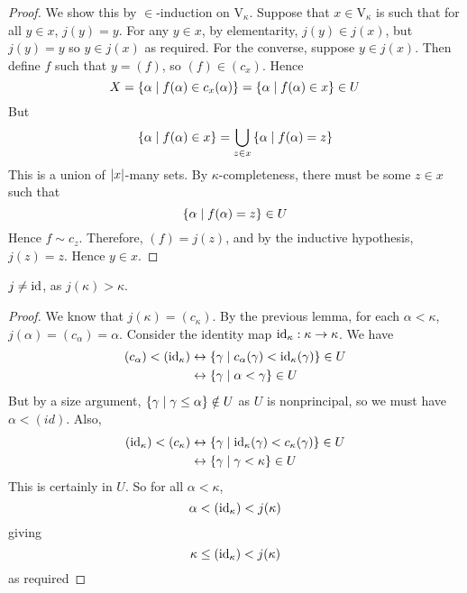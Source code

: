 \begin{proof}
    We show this by \( \in \)-induction on \( \mathrm{V}_\kappa \).
    Suppose that \( x \in \mathrm{V}_\kappa \) is such that for all \( y \in x \), \( j(y) = y \).
    For any \( y \in x \), by elementarity, \( j(y) \in j(x) \), but \( j(y) = y \) so \( y \in j(x) \) as required.
    For the converse, suppose \( y \in j(x) \).
    Then define \( f \) such that \( y = (f) \), so \( (f) \in (c_x) \).
    Hence
    \[ X = \qty{\alpha \mid f(\alpha) \in c_x(\alpha)} = \qty{\alpha \mid f(\alpha) \in x} \in U \]
    But
    \[ \qty{\alpha \mid f(\alpha) \in x} = \bigcup_{z \in x} \qty{\alpha \mid f(\alpha) = z} \]
    This is a union of \( \abs{x} \)-many sets.
    By \( \kappa \)-completeness, there must be some \( z \in x \) such that
    \[ \qty{\alpha \mid f(\alpha) = z} \in U \]
    Hence \( f \sim c_z \).
    Therefore, \( (f) = j(z) \), and by the inductive hypothesis, \( j(z) = z \).
    Hence \( y \in x \).
\end{proof}
\begin{lemma}
    \( j \neq \operatorname{id} \), as \( j(\kappa) > \kappa \).
\end{lemma}
\begin{proof}
    We know that \( j(\kappa) = (c_\kappa) \).
    By the previous lemma, for each \( \alpha < \kappa \), \( j(\alpha) = (c_\alpha) = \alpha \).
    Consider the identity map \( \operatorname{id}_\kappa : \kappa \to \kappa \).
    We have
    \begin{align*}
        (c_\alpha) < (\operatorname{id}_\kappa) &\leftrightarrow \qty{\gamma \mid c_\alpha(\gamma) < \operatorname{id}_\kappa(\gamma)} \in U \\
        &\leftrightarrow \qty{\gamma \mid \alpha < \gamma} \in U
    \end{align*}
    But by a size argument, \( \qty{\gamma \mid \gamma \leq \alpha} \notin U \) as \( U \) is nonprincipal, so we must have \( \alpha < (id) \).
    Also,
    \begin{align*}
        (\operatorname{id}_\kappa) < (c_\kappa) &\leftrightarrow \qty{\gamma \mid \operatorname{id}_\kappa(\gamma) < c_\kappa(\gamma)} \in U \\
        &\leftrightarrow \qty{\gamma \mid \gamma < \kappa} \in U
    \end{align*}
    This is certainly in \( U \).
    So for all \( \alpha < \kappa \),
    \[ \alpha < (\operatorname{id}_\kappa) < j(\kappa) \]
    giving
    \[ \kappa \leq (\operatorname{id}_\kappa) < j(\kappa) \]
    as required
\end{proof}
